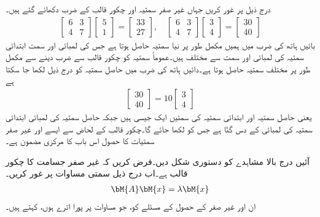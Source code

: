 درج ذیل پر غور کریں جہاں غیر صفر سمتیہ اور چکور قالب کے ضرب دکھائے گئے ہیں۔
\begin{align}\label{مساوات_آئگنی_پہلی_مثال}
\begin{bmatrix}6&3\\4&7  \end{bmatrix}\begin{bmatrix} 5\\1 \end{bmatrix}=\begin{bmatrix}33\\27  \end{bmatrix},\quad \begin{bmatrix}6&3\\4&7  \end{bmatrix}\begin{bmatrix} 3\\4 \end{bmatrix}=\begin{bmatrix}30\\40  \end{bmatrix}
\end{align} 
بائیں ہاتھ کی ضرب میں ہمیں مکمل طور پر نیا سمتیہ حاصل ہوتا ہے جس کی لمبائی اور سمت ابتدائی سمتیہ کی لمبائی اور سمت  سے مختلف ہیں۔عموماً  سمتیہ کو چکور قالب سے ضرب دینے  سے مکمل طور پر مختلف سمتیہ حاصل ہوتا ہے۔دائیں ہاتھ کی ضرب میں حاصل سمتیہ کو درج ذیل لکھا جا سکتا ہے 
\begin{align*}
\begin{bmatrix}30\\40  \end{bmatrix}=10\begin{bmatrix}3\\4  \end{bmatrix}
\end{align*}
یعنی حاصل سمتیہ اور ابتدائی سمتیہ کی سمتیں ایک جیسی ہیں جبکہ حاصل سمتیہ کی لمبائی ابتدائی سمتیہ کی لمبائی کے دس گنّا ہے جس کو  لکھا جائے گا۔چکور قالب  کے لحاض سے  ایسے  اور غیر صفر سمتیات کا حصول اس باب کا مرکزی مضمون ہے۔  

آئیں درج بالا مشاہدے کو دستوری شکل دیں۔فرض کریں کہ  غیر صفر  جسامت کا چکور قالب ہے۔اب درج ذیل سمتی مساوات پر غور کریں۔
\begin{align}\label{مساوات_آئگنی_مسئلہ_ب}
\bM{A}\bM{x}=\lambda \bM{x}
\end{align}
ان  اور غیر صفر  کے حصول کے مسئلے کو، جو مساوات  پر پورا اترے ہوں،   کہتے ہیں۔

